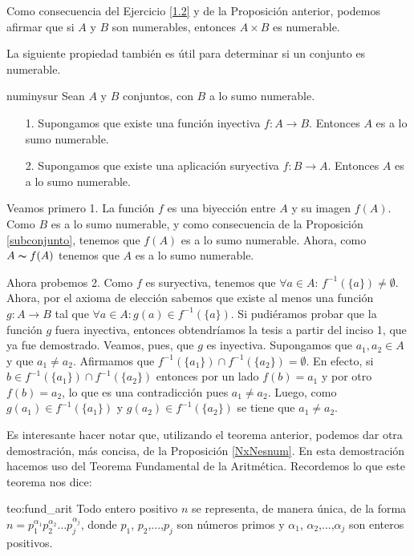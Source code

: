 Como consecuencia del Ejercicio \vref{1.2} y de la Proposición
anterior, podemos afirmar que si $A$ y $B$ son numerables,
entonces $A\times B$ es numerable.



La siguiente propiedad también es útil para determinar si un
conjunto es numerable.

\begin{proposicion}{numinysur} Sean $A$ y $B$ conjuntos, con $B$ a lo sumo
numerable.
\begin{itemize}
\item[1.] Supongamos que existe una función inyectiva 
$f:A \longrightarrow B$. Entonces $A$ es a lo sumo numerable.
\item[2.] Supongamos que existe una aplicación suryectiva
$f:B\longrightarrow A$. Entonces $A$ es a lo sumo numerable.
\end{itemize}
\end{proposicion}
\begin{demo} Veamos primero 1. La función $f$ es  una biyección entre $A$ y su
imagen $f(A)$. Como $B$ es a lo sumo numerable,  y como
consecuencia de la Proposición \vref{subconjunto}, tenemos que
$f(A)$ es a lo sumo numerable. Ahora, como $A\thicksim f(A)$
tenemos que $A$ es a lo sumo numerable.

Ahora probemos 2. Como $f$ es suryectiva, tenemos que $\forall
a\in A$: $f^{-1}(\{a\})\neq\emptyset$. Ahora, por el axioma de
elección sabemos que existe al menos una función
$g:A\longrightarrow B$ tal que $\forall a\in A:g(a)\in
f^{-1}(\{a\})$. Si pudiéramos probar que la función $g$ fuera
inyectiva, entonces obtendríamos la tesis a partir del inciso
1, que ya fue demostrado. Veamos, pues, que $g$ es inyectiva.
Supongamos que $a_1,a_2\in A$ y que $a_1\neq a_2$. Afirmamos que
$f^{-1}(\{a_1\})\cap f^{-1}(\{a_2\})=\emptyset$. En efecto, si
$b\in f^{-1}(\{a_1\})\cap f^{-1}(\{a_2\})$ entonces por un lado
 $f(b)=a_1$ y por otro $f(b)=a_2$, lo que es una contradicción pues $a_1\neq a_2$. Luego, como $g(a_1)\in f^{-1}(\{a_1\})$ y 
$g(a_2)\in f^{-1}(\{a_2\})$ se tiene que $a_1\neq a_2$.
 \end{demo}

Es interesante hacer notar que, utilizando el teorema anterior,
podemos dar otra demostración, más concisa, de la
Proposición \vref{NxNesnum}. En esta demostración hacemos uso del Teorema Fundamental de la
Aritmética. Recordemos lo que este teorema nos dice:


\begin{teorema}{teo:fund_arit} Todo entero positivo $n$ se representa, de
manera única, de la forma $n=p_1^{\alpha_1}p_2^{\alpha_2}\dots
p_j^{\alpha_j}$, donde $p_1$, $p_2$,...,$p_j$ son números primos
y $\alpha_1$, $\alpha_2$,...,$\alpha_j$ son enteros positivos.
\end{teorema}

